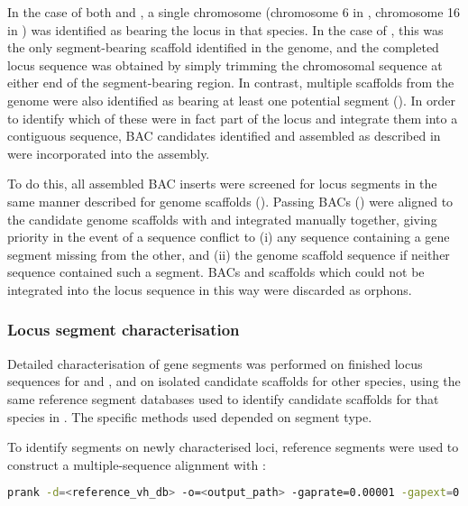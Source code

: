 In the case of both \nfu and \xma, a single chromosome (chromosome 6 in \Nfu, chromosome 16 in \Xma) was identified as bearing the \igh{} locus in that species. In the case of \Xma, this was the only segment-bearing scaffold identified in the genome, and the completed locus sequence was obtained by simply trimming the chromosomal sequence at either end of the segment-bearing region. In contrast, multiple scaffolds from the \Nfu genome were also identified as bearing at least one potential \igh{} segment (). In order to identify which of these were in fact part of the locus and integrate them into a contiguous sequence, BAC candidates identified and assembled as described in  were incorporated into the assembly.

To do this, all assembled BAC inserts were screened for \igh{} locus segments in the same manner described for genome scaffolds (). Passing BACs () were aligned to the candidate genome scaffolds with  and integrated manually together, giving priority in the event of a sequence conflict to (i) any sequence containing a gene segment missing from the other, and (ii) the genome scaffold sequence if neither sequence contained such a segment. BACs and scaffolds which could not be integrated into the locus sequence in this way were discarded as orphons.

\subsubsection{Locus segment characterisation}
\label{sec:methods_comp_locus_segments}

Detailed characterisation of \igh{} gene segments was performed on finished \igh{} locus sequences for \xma and \nfu, and on isolated candidate scaffolds for other species, using the same reference segment databases used to identify candidate scaffolds for that species in . %
The specific methods used depended on segment type.

\subsubsubsection{\vh}

\noindent To identify \vh segments on newly characterised loci, reference \vh segments were used to construct a multiple-sequence alignment with  \parencite{loytynoja2014prank}:

\begin{lstlisting}[language=bash]
prank -d=<reference_vh_db> -o=<output_path> -gaprate=0.00001 -gapext=0.00001 -F -termgap
\end{lstlisting}

